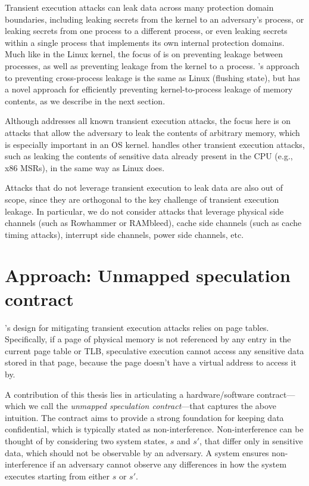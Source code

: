 Transient execution attacks can leak data across many protection domain
boundaries, including leaking secrets from the kernel to an adversary's
process, or leaking secrets from one process to a different process,
or even leaking secrets within a single process that implements its
own internal protection domains.  Much like in the Linux kernel, the
focus of \sys is on preventing leakage between processes, as well as
preventing leakage from the kernel to a process.  \sys's approach to
preventing cross-process leakage is the same as Linux (flushing state),
but \sys has a novel approach for efficiently preventing kernel-to-process
leakage of memory contents, as we describe in the next section.

Although \sys addresses all known transient execution attacks, the focus
here is on attacks that allow the adversary to leak the contents
of arbitrary memory, which is especially important in an OS kernel.
\sys handles other transient execution attacks, such as leaking the
contents of sensitive data already present in the CPU (e.g., x86 MSRs),
in the same way as Linux does.

Attacks that do not leverage transient execution to leak data are also
out of scope, since they are orthogonal to the key
challenge of transient execution leakage.  In particular, we do not
consider attacks that leverage physical side channels (such
as Rowhammer or RAMbleed), cache side channels (such as cache timing
attacks), interrupt side channels, power side channels, etc.

\section{Approach: Unmapped speculation contract}
\label{s:ward-approach}

\sys's design for mitigating transient execution attacks relies
on page tables.  Specifically, if a page of physical
memory is not referenced by any entry in the current page table or
TLB, speculative execution cannot access any sensitive data stored in
that page, because the page doesn't have a virtual address to access
it by.


A contribution of this thesis lies in articulating a hardware/software
contract---which we call the \emph{unmapped speculation contract}---that
captures the above intuition.  The contract aims to provide a strong
foundation for keeping data confidential, which is typically stated as
non-interference.  Non-interference can be thought of by considering
two system states, $s$ and $s'$, that differ only in sensitive data,
which should not be observable by an adversary.  A system ensures
non-interference if an adversary cannot observe any differences in how
the system executes starting from either $s$ or $s'$.

